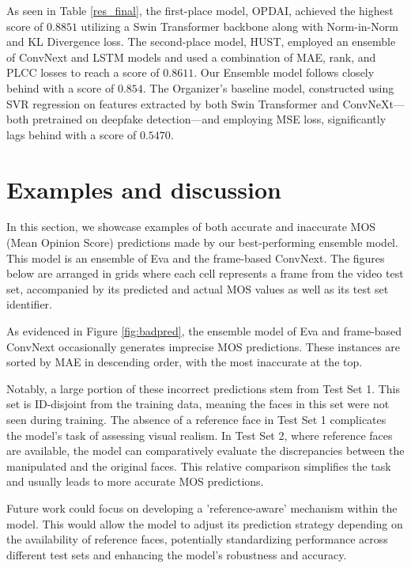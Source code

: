 \documentclass[a4paper,12pt,openright]{book}
\begin{document}
As seen in Table \ref{res_final}, the first-place model, OPDAI, achieved the highest score of \(0.8851\) utilizing a Swin Transformer backbone along with Norm-in-Norm and KL Divergence loss. The second-place model, HUST, employed an ensemble of ConvNext and LSTM models and used a combination of MAE, rank, and PLCC losses to reach a score of \(0.8611\). Our Ensemble model follows closely behind with a score of \(0.854\). The Organizer's baseline model, constructed using SVR regression on features extracted by both Swin Transformer and ConvNeXt—both pretrained on deepfake detection—and employing MSE loss, significantly lags behind with a score of \(0.5470\).









\section{Examples and discussion}
In this section, we showcase examples of both accurate and inaccurate MOS (Mean Opinion Score) predictions made by our best-performing ensemble model. This model is an ensemble of Eva and the frame-based ConvNext. The figures below are arranged in grids where each cell represents a frame from the video test set, accompanied by its predicted and actual MOS values as well as its test set identifier.

As evidenced in Figure \ref{fig:badpred}, the ensemble model of Eva and frame-based ConvNext occasionally generates imprecise MOS predictions. These instances are sorted by MAE in descending order, with the most inaccurate at the top.

Notably, a large portion of these incorrect predictions stem from Test Set 1. This set is ID-disjoint from the training data, meaning the faces in this set were not seen during training. The absence of a reference face in Test Set 1 complicates the model's task of assessing visual realism. In Test Set 2, where reference faces are available, the model can comparatively evaluate the discrepancies between the manipulated and the original faces. This relative comparison simplifies the task and usually leads to more accurate MOS predictions.

Future work could focus on developing a 'reference-aware' mechanism within the model. This would allow the model to adjust its prediction strategy depending on the availability of reference faces, potentially standardizing performance across different test sets and enhancing the model's robustness and accuracy.
\end{document}
